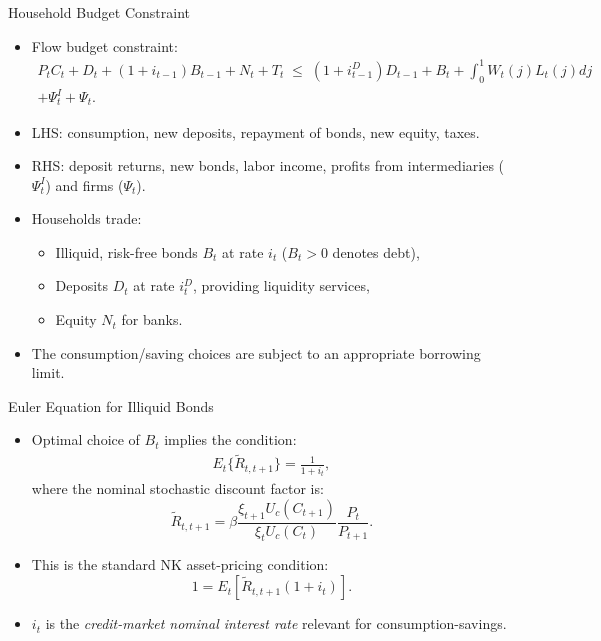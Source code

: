 \documentclass[11pt,aspectratio=169]{beamer}
\begin{document}
\begin{frame}{Household Budget Constraint}
  \begin{itemize}
    \item Flow budget constraint:
\begin{align*}
    P_t C_t + D_t + (1+i_{t-1}) B_{t-1} + N_t + T_t
      \;\le\; (1+i_{t-1}^D) D_{t-1} + B_t
        + \int_0^1 W_t(j) L_t(j) dj \\
        + \Psi_t^I + \Psi_t.
\end{align*}
      \item LHS: consumption, new deposits, repayment of bonds, new equity, taxes.
      \item RHS: deposit returns, new bonds, labor income, profits from intermediaries ($\Psi_t^I$) and firms ($\Psi_t$).
    \item Households trade:
    \begin{itemize}
      \item Illiquid, risk-free bonds $B_t$ at rate $i_t$ ($B_t>0$ denotes debt),
      \item Deposits $D_t$ at rate $i_t^D$, providing liquidity services,
      \item Equity $N_t$ for banks.
    \end{itemize}
    \item The consumption/saving choices are subject to an appropriate borrowing limit.
  \end{itemize}
\end{frame}

\begin{frame}{Euler Equation for Illiquid Bonds}
  \begin{itemize}
    \item Optimal choice of $B_t$ implies the condition:
    \begin{align}
        E_t\{\tilde{R}_{t,t+1}\} = \frac{1}{1+i_t}, \label{8.8}
    \end{align}
    where the nominal stochastic discount factor is: $$\tilde{R}_{t,t+1}
      = \beta
        \frac{\xi_{t+1} U_c(C_{t+1})}{\xi_t U_c(C_t)}
        \frac{P_t}{P_{t+1}}.$$
    \item This is the standard NK asset-pricing condition: $$1 = E_t\left[
      \tilde{R}_{t,t+1} (1+i_t)
      \right].$$
    \item $i_t$ is the \emph{credit-market nominal interest rate} relevant for consumption-savings.
  \end{itemize}
\end{frame}
\end{document}
